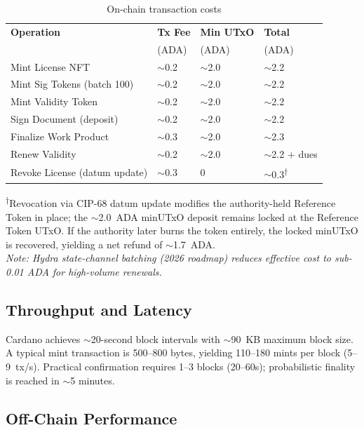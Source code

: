\documentclass[conference,10pt]{IEEEtran}
\begin{document}
\begin{table}[t]
\centering
\caption{On-chain transaction costs}
\label{tab:costs}
\scriptsize
\begin{tabular}{@{}L{3cm}C{1.2cm}C{1.2cm}C{1.3cm}@{}}
\toprule
\textbf{Operation} & \textbf{Tx Fee} & \textbf{Min UTxO} & \textbf{Total} \\
 & (ADA) & (ADA) & (ADA) \\
\midrule
Mint License NFT & $\sim$0.2 & $\sim$2.0 & $\sim$2.2 \\
Mint Sig Tokens (batch 100) & $\sim$0.2 & $\sim$2.0 & $\sim$2.2 \\
Mint Validity Token & $\sim$0.2 & $\sim$2.0 & $\sim$2.2 \\
Sign Document (deposit) & $\sim$0.2 & $\sim$2.0 & $\sim$2.2 \\
Finalize Work Product & $\sim$0.3 & $\sim$2.0 & $\sim$2.3 \\
Renew Validity & $\sim$0.2 & $\sim$2.0 & $\sim$2.2 + dues \\
Revoke License (datum update) & $\sim$0.3 & 0 & $\sim$0.3\textsuperscript{$\dagger$} \\
\bottomrule
\end{tabular}
\vspace{2pt}
\scriptsize\textsuperscript{$\dagger$}Revocation via CIP-68 datum update modifies the authority-held Reference Token in place; the ${\sim}$2.0~ADA minUTxO deposit remains locked at the Reference Token UTxO. If the authority later burns the token entirely, the locked minUTxO is recovered, yielding a net refund of ${\sim}$1.7~ADA.\\[2pt]
\textit{Note: Hydra state-channel batching (2026 roadmap) reduces effective cost to sub-0.01 ADA for high-volume renewals.}
\end{table}

\subsection{Throughput and Latency}

Cardano achieves $\sim$20-second block intervals with $\sim$90~KB maximum block size. A typical mint transaction is 500--800 bytes, yielding 110--180 mints per block (5--9~tx/s). Practical confirmation requires 1--3 blocks (20--60s); probabilistic finality is reached in $\sim$5 minutes.

\subsection{Off-Chain Performance}
\end{document}
